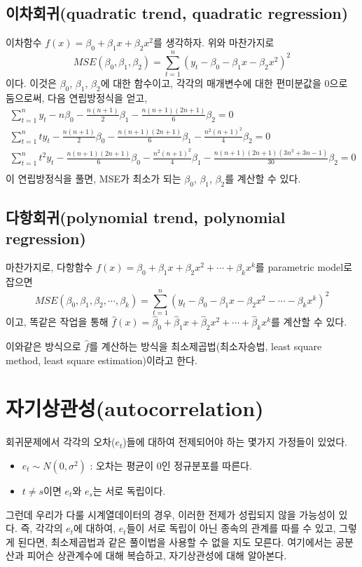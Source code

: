 \documentclass{article}
\begin{document}
\subsection{이차회귀(quadratic trend, quadratic regression)}
이차함수 \(f(x)=\beta_0+\beta_1x+\beta_2x^2\)를 생각하자.
위와 마찬가지로
\[MSE(\beta_0,\beta_1,\beta_2)=\sum_{t=1}^n(y_t-\beta_0-\beta_1x-\beta_2x^2)^2\]
이다.
이것은 \(\beta_0\), \(\beta_1\), \(\beta_2\)에 대한 함수이고, 각각의 매개변수에 대한 편미분값을 0으로 둠으로써, 다음 연립방정식을 얻고,
\begin{gather*}
\sum_{t=1}^ny_t-n\beta_0-\frac{n(n+1)}2\beta_1-\frac{n(n+1)(2n+1)}6\beta_2=0\\
\sum_{t=1}^nty_t-\frac{n(n+1)}2\beta_0-\frac{n(n+1)(2n+1)}6\beta_1-\frac{n^2(n+1)^2}4\beta_2=0\\
\sum_{t=1}^nt^2y_t-\frac{n(n+1)(2n+1)}6\beta_0-\frac{n^2(n+1)^2}4\beta_1-\frac{n(n+1)(2n+1)(3n^2+3n-1)}{30}\beta_2=0\\
\end{gather*}
이 연립방정식을 풀면, MSE가 최소가 되는 \(\beta_0\), \(\beta_1\), \(\beta_2\)를 계산할 수 있다.

\subsection{다항회귀(polynomial trend, polynomial regression)}
마찬가지로, 다항함수 \(f(x)=\beta_0+\beta_1x+\beta_2x^2+\cdots+\beta_kx^k\)를 parametric model로 잡으면
\[MSE(\beta_0,\beta_1,\beta_2,\cdots,\beta_k)=\sum_{t=1}^n(y_t-\beta_0-\beta_1x-\beta_2x^2-\cdots-\beta_kx^k)^2\]
이고, 똑같은 작업을 통해 \(\hat f(x)=\hat \beta_0+\hat \beta_1x+\hat \beta_2x^2+\cdots+\hat \beta_kx^k\)를 계산할 수 있다.

이와같은 방식으로 \(\hat f\)를 계산하는 방식을 최소제곱법(최소자승법, least square method, least square estimation)이라고 한다.

\section{자기상관성(autocorrelation)}
회귀문제에서 각각의 오차(\(e_t\))들에 대하여 전제되어야 하는 몇가지 가정들이 있었다.
\begin{itemize}
\item
\(e_t\sim N(0,\sigma^2)\) : 오차는 평균이 0인 정규분포를 따른다.
\item
\(t\neq s\)이면 \(e_t\)와 \(e_s\)는 서로 독립이다.
\end{itemize}
그런데 우리가 다룰 시계열데이터의 경우, 이러한 전제가 성립되지 않을 가능성이 있다.
즉, 각각의 \(e_t\)에 대하여, \(e_t\)들이 서로 독립이 아닌 종속의 관계를 따를 수 있고, 그렇게 된다면, 최소제곱법과 같은 풀이법을 사용할 수 없을 지도 모른다.
여기에서는 공분산과 피어슨 상관계수에 대해 복습하고, 자기상관성에 대해 알아본다.
\end{document}
